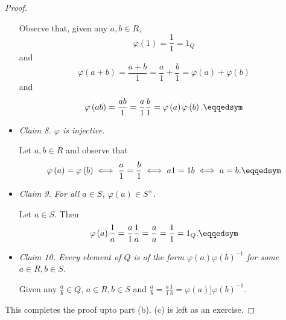 \documentclass[pmath347]{subfiles}
\begin{document}
\begin{proof}
\begin{itemize}
                \begin{subproof}
                    Observe that, given any $a,b\in R$,
                    \begin{equation*}
                        \varphi\left( 1 \right) = \frac{1}{1} = 1_Q
                    \end{equation*}
                    and
                    \begin{equation*}
                        \varphi\left( a+b \right) = \frac{a+b}{1} = \frac{a}{1}+\frac{b}{1} = \varphi\left( a \right) + \varphi\left( b \right) 
                    \end{equation*}
                    and
                    \begin{equation*}
                        \varphi\left( ab \right) = \frac{ab}{1} = \frac{a}{1}\frac{b}{1} = \varphi\left( a \right) \varphi\left( b \right) . \eqqedsym
                    \end{equation*}
                \end{subproof}

            \item \textit{Claim 8. $\varphi$ is injective.}

                \begin{subproof}
                    Let $a,b\in R$ and observe that
                    \begin{equation*}
                        \varphi\left( a \right) = \varphi\left( b \right) \iff \frac{a}{1} = \frac{b}{1} \iff a1 = 1b \iff a = b. \eqqedsym
                    \end{equation*}
                \end{subproof}

            \item \textit{Claim 9. For all $a\in S$, $\varphi\left( a \right) \in S^\times$.}

                \begin{subproof}
                    Let $a\in S$. Then
                    \begin{equation*}
                        \varphi\left( a \right) \frac{1}{a} = \frac{a}{1}\frac{1}{a} = \frac{a}{a} = \frac{1}{1} = 1_Q. \eqqedsym
                    \end{equation*}
                \end{subproof}

            \item \textit{Claim 10. Every element of $Q$ is of the form $\varphi\left( a \right) \varphi\left( b \right) ^{-1} $ for some $a\in R, b\in S$.}

                \begin{subproof}
                    Given any $\frac{a}{b}\in Q$, $a\in R, b\in S$ and $\frac{a}{b} = \frac{a}{1}\frac{1}{b} = \varphi\left( a \right) ]\varphi\left( b \right) ^{-1} $.
                \end{subproof}
        \end{itemize} 
        This completes the proof upto part (b). (c) is left as an exercise. \qqedsym
    \end{proof}
\end{document}
